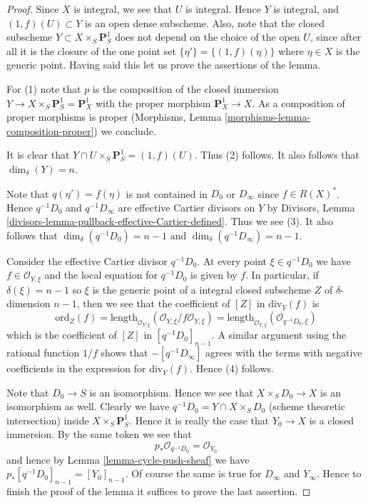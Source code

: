 \begin{proof}
Since $X$ is integral, we see that $U$ is integral.
Hence $Y$ is integral, and $(1,f)(U) \subset Y$ is an open dense subscheme.
Also, note that the closed subscheme $Y \subset X \times_S \mathbf{P}^1_S$
does not depend on the choice of the open $U$, since after all it is
the closure of the one point set $\{\eta'\} = \{(1, f)(\eta)\}$
where $\eta \in X$ is the generic point. Having said this let us
prove the assertions of the lemma.

\medskip\noindent
For (1) note that $p$ is the composition of the closed immersion
$Y \to X \times_S \mathbf{P}^1_S = \mathbf{P}^1_X$ with the proper
morphism $\mathbf{P}^1_X \to X$. As a composition of proper morphisms
is proper (Morphisms, Lemma \ref{morphisms-lemma-composition-proper})
we conclude.

\medskip\noindent
It is clear that $Y \cap U \times_S \mathbf{P}^1_S = (1, f)(U)$.
Thus (2) follows. It also follows that $\dim_\delta(Y) = n$.

\medskip\noindent
Note that $q(\eta') = f(\eta)$ is not contained in $D_0$ or $D_\infty$
since $f \in R(X)^*$. Hence $q^{-1}D_0$ and $q^{-1}D_\infty$ are
effective Cartier divisors on $Y$ by
Divisors, Lemma \ref{divisors-lemma-pullback-effective-Cartier-defined}.
Thus we see (3). It also follows that $\dim_\delta(q^{-1}D_0) = n - 1$
and $\dim_\delta(q^{-1}D_\infty) = n - 1$.

\medskip\noindent
Consider the effective Cartier divisor $q^{-1}D_0$.
At every point $\xi \in q^{-1}D_0$ we have $f \in \mathcal{O}_{Y, \xi}$ and
the local equation for $q^{-1}D_0$ is given by $f$.
In particular, if $\delta(\xi) = n - 1$ so $\xi$ is the generic point
of a integral closed subscheme $Z$ of $\delta$-dimension $n - 1$,
then we see that the coefficient of $[Z]$ in $\text{div}_Y(f)$ is
$$
\text{ord}_Z(f) =
\text{length}_{\mathcal{O}_{Y, \xi}}
(\mathcal{O}_{Y, \xi}/f\mathcal{O}_{Y, \xi}) =
\text{length}_{\mathcal{O}_{Y, \xi}}
(\mathcal{O}_{q^{-1}D_0, \xi})
$$
which is the coefficient of $[Z]$ in $[q^{-1}D_0]_{n - 1}$. A similar
argument using the rational function $1/f$ shows that
$-[q^{-1}D_\infty]$ agrees with the terms with negative coefficients in
the expression for $\text{div}_Y(f)$. Hence (4) follows.

\medskip\noindent
Note that $D_0 \to S$ is an isomorphism. Hence we see that
$X \times_S D_0 \to X$ is an isomorphism as well. Clearly
we have $q^{-1}D_0 = Y \cap X \times_S D_0$ (scheme theoretic intersection)
inside $X \times_S \mathbf{P}^1_S$. Hence it is really the case that
$Y_0 \to X$ is a closed immersion. By the same token we see that
$$
p_*\mathcal{O}_{q^{-1}D_0} = \mathcal{O}_{Y_0}
$$
and hence by Lemma \ref{lemma-cycle-push-sheaf} we
have $p_*[q^{-1}D_0]_{n - 1} = [Y_0]_{n - 1}$. Of course the same
is true for $D_\infty$ and $Y_\infty$. Hence to finish the proof of
the lemma it suffices to prove the last assertion.


\end{proof}

